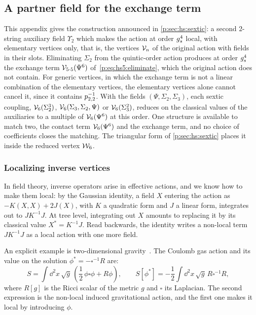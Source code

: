 \subsection{A partner field for the exchange term}
\label{p:app:wrong-sign}



This appendix gives the construction announced in \cref{p:sec:hs:sextic}: a second $2$-string auxiliary field $\Upsilon_2$ which makes the action at order $g_s^4$ local, with elementary vertices only, that is, the vertices $\mathcal{V}_{n}$ of the original action with fields in their slots.
  Eliminating $\Sigma_2$ from the quintic-order action produces at order $g_s^4$ the exchange term $\mathcal{V}_{5 \cdot 5}(\Psi^6)$ of~\eqref{p:eq:hs5:eliminate}, which the original action does not contain.
  For generic vertices, in which the exchange term is not a linear combination of the elementary vertices, the elementary vertices alone cannot cancel it, since it contains $p_{2,2}^{-1}$.
  With the fields $(\Psi, \Sigma_2, \Sigma_3)$, each sextic coupling, $\mathcal{V}_{6}(\Sigma_2^3)$, $\mathcal{V}_{6}(\Sigma_3, \Sigma_2, \Psi)$ or $\mathcal{V}_{6}(\Sigma_3^2)$, reduces on the classical values of the auxiliaries to a multiple of $\mathcal{V}_{6}(\Psi^6)$ at this order.
    One structure is available to match two, the contact term $\mathcal{V}_{6}(\Psi^6)$ and the exchange term, and no choice of coefficients closes the matching.
  The triangular form of \cref{p:sec:hs:sextic} places it inside the reduced vertex $\mathcal{W}_{6}$.


\subsubsection{Localizing inverse vertices}


In field theory, inverse operators arise in effective actions, and we know how to make them local: by the Gaussian identity, a field $X$ entering the action as $- K(X, X) + 2 J(X)$, with $K$ a quadratic form and $J$ a linear form, integrates out to $J K^{-1} J$.
  At tree level, integrating out $X$ amounts to replacing it by its classical value $X^* = K^{-1} J$.
  Read backwards, the identity writes a non-local term $J K^{-1} J$ as a local action with one more field.

An explicit example is two-dimensional gravity~\cite{Polyakov:1981:QuantumGeometryBosonic}.
  The Coulomb gas action and its value on the solution $\phi^* = - \square^{-1} R$ are:
  \begin{equation}
  \label{p:eq:wsp:coulomb}
  S
    = \int \dd^2 x \, \sqrt{g} \, \left(
      \frac{1}{2} \, \phi \square \phi
      + R \phi
    \right),
  \qquad
  S[\phi^*]
    = - \frac{1}{2} \int \dd^2 x \, \sqrt{g} \, R \square^{-1} R,
\end{equation}
  where $R[g]$ is the Ricci scalar of the metric $g$ and $\square$ its Laplacian.
  The second expression is the non-local induced gravitational action, and the first one makes it local by introducing $\phi$.


